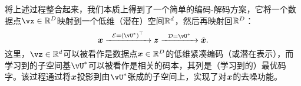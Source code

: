 \documentclass[../../book-main_zh.tex]{subfiles}
\begin{document}
将上述过程整合起来，我们本质上得到了一个简单的编码-解码方案，它将一个数据点$\vx \in \R^D$映射到一个低维（潜在）空间$\mathbb{R}^d$，然后再映射回$\mathbb{R}^D$：
\begin{equation}
\x \xrightarrow{\hspace{2mm} \mathcal{E} = (\vU^\ast)^\top \hspace{2mm}}  \z \xrightarrow{\hspace{2mm} \mathcal{D} = \vU^\ast \hspace{2mm}}   \hat{\x}.  
\label{eqn:autoencoding-PCA}
\end{equation}
这里，$\vz \in \R^d$可以被看作是数据点$\bm{x} \in \mathbb{R}^D$的低维紧凑编码（或潜在表示），而学习到的子空间基$\vU^\ast$可以被看作是相关的码本，其列是（学习到的）最优码字。该过程通过将$\bm{x}$投影到由$\vU^\ast$张成的子空间上，实现了对$\bm{x}$的去噪功能。
\end{document}
